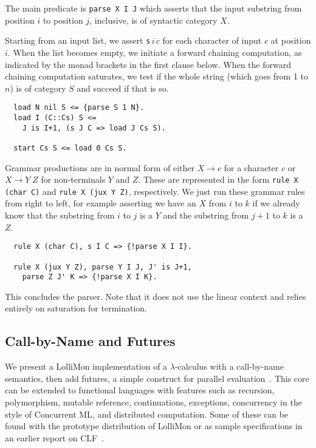 \documentclass{sig-alt}
\begin{document}
The main predicate is \texttt{parse X I J} which asserts
that the input substring from position $i$ to position $j$, inclusive, is of
syntactic category $X$.

Starting from an input list,
we assert \texttt{s}$\,i\,c$ for each character of input $c$ at
position $i$.  When the list becomes empty, we initiate a forward
chaining computation, as indicated by the monad brackets in the first
clause below.  When the forward chaining computation saturates, we
test if the whole string (which goes from 1 to $n$) is of category $S$
and succeed if that is so.

\begin{small}\begin{verbatim}
  load N nil S <= {parse S 1 N}.
  load I (C::Cs) S <= 
    J is I+1, (s J C => load J Cs S).

  start Cs S <= load 0 Cs S.
\end{verbatim}\end{small}

Grammar productions are in normal form of either
$X \rightarrow c$ for a character $c$ or
$X \rightarrow Y\; Z$ for non-terminals $Y$ and $Z$.
These are represented in the form \texttt{rule X (char C)}
and \texttt{rule X (jux Y Z)}, respectively.  We
just run these grammar rules from right to left,
for example asserting we have an $X$ from $i$ to $k$ if
we already know that the substring from $i$ to $j$
is a $Y$ and the substring from $j+1$ to $k$ is a $Z$.

\begin{small}\begin{verbatim}
  rule X (char C), s I C => {!parse X I I}.

  rule X (jux Y Z), parse Y I J, J' is J+1, 
    parse Z J' K => {!parse X I K}.
\end{verbatim}\end{small}

This concludes the parser.  Note that it does
not use the linear context and relies entirely on
saturation for termination.

\subsection{Call-by-Name and Futures}
\label{ssec:mml}

We present a LolliMon implementation of a $\lambda$-calculus with a
call-by-name semantics, then add futures, a simple construct for
parallel evaluation~\cite{Halstead85}.  This core can be extended to
functional languages with features such as recursion, polymorphism,
mutable reference, continuations, exceptions, concurrency in the style
of Concurrent ML, and distributed computation.  Some of these can be
found with the prototype distribution of LolliMon or as sample specifications in
an earlier report on CLF~\cite{Cervesato02tr}.
\end{document}
